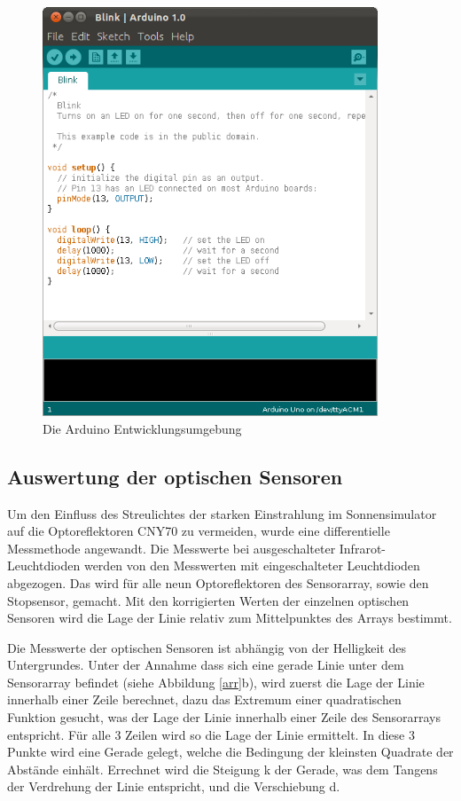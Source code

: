 \documentclass[a4paper,bibtotoc,oneside]{scrbook}
\begin{document}
\begin{figure}[htbp]
\centering
\includegraphics[width=100mm]{img/Arduino.png}
\caption{Die Arduino Entwicklungsumgebung}\label{ardu2}
\end{figure}

\subsection{Auswertung der optischen Sensoren}\thispagestyle{empty}
Um den Einfluss des Streulichtes der starken Einstrahlung im Sonnensimulator auf die Optoreflektoren CNY70 zu vermeiden, wurde eine differentielle Messmethode angewandt. Die Messwerte bei ausgeschalteter Infrarot-Leuchtdioden werden von den Messwerten mit eingeschalteter Leuchtdioden abgezogen.
Das wird für alle neun Optoreflektoren des Sensorarray, sowie den Stopsensor, gemacht.
Mit den korrigierten Werten der einzelnen optischen Sensoren wird die Lage der Linie relativ zum Mittelpunktes des Arrays bestimmt. 

Die Messwerte der optischen Sensoren ist abhängig von der Helligkeit des Untergrundes. Unter der Annahme dass sich eine gerade Linie unter dem Sensorarray befindet (siehe Abbildung \ref{arr}b), wird zuerst die Lage der Linie innerhalb einer Zeile berechnet, dazu das Extremum einer quadratischen Funktion gesucht, was der Lage der Linie innerhalb einer Zeile des Sensorarrays entspricht. 
Für alle 3 Zeilen wird so die Lage der Linie ermittelt. In diese 3 Punkte wird eine Gerade gelegt, welche die Bedingung der kleinsten Quadrate der Abstände einhält. Errechnet wird die Steigung k der Gerade, was dem Tangens der Verdrehung der Linie entspricht, und die Verschiebung d.
 
\end{document}
